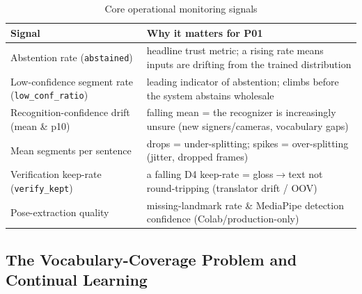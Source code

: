 \documentclass[12pt,a4paper]{article}
\begin{document}
\begin{table}[H]
\centering
\caption{Core operational monitoring signals}
\small
\begin{tabularx}{\linewidth}{@{} l L @{}}
\toprule
\textbf{Signal} & \textbf{Why it matters for P01} \\
\midrule
Abstention rate (\texttt{abstained}) & headline trust metric; a rising rate means inputs are drifting from the trained distribution \\
Low-confidence segment rate (\texttt{low\_conf\_ratio}) & leading indicator of abstention; climbs before the system abstains wholesale \\
Recognition-confidence drift (mean \& p10) & falling mean = the recognizer is increasingly unsure (new signers/cameras, vocabulary gaps) \\
Mean segments per sentence & drops = under-splitting; spikes = over-splitting (jitter, dropped frames) \\
Verification keep-rate (\texttt{verify\_kept}) & a falling D4 keep-rate = gloss$\rightarrow$text not round-tripping (translator drift / OOV) \\
Pose-extraction quality & missing-landmark rate \& MediaPipe detection confidence (Colab/production-only) \\
\bottomrule
\end{tabularx}
\end{table}

\subsection{The Vocabulary-Coverage Problem and Continual Learning}
\end{document}
